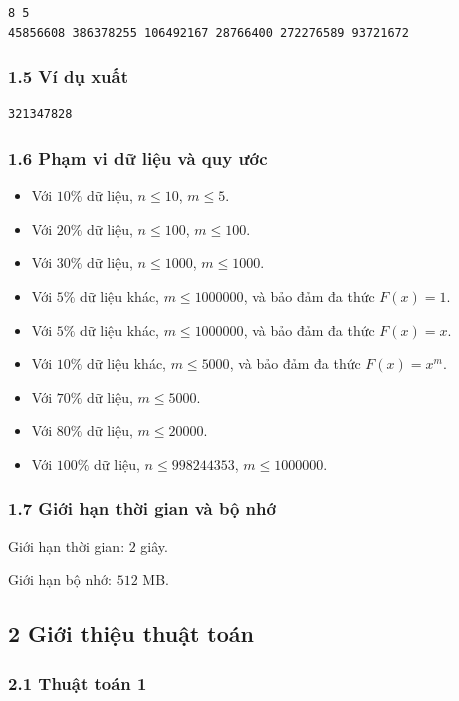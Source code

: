 \documentclass[11pt]{article}
\begin{document}
\begin{verbatim}
8 5
45856608 386378255 106492167 28766400 272276589 93721672
\end{verbatim}

\subsubsection*{1.5 Ví dụ xuất}

\begin{verbatim}
321347828
\end{verbatim}

\subsubsection*{1.6 Phạm vi dữ liệu và quy ước}

\begin{itemize}
  \item Với \(10\%\) dữ liệu, \(n\le 10\), \(m\le 5\).
  \item Với \(20\%\) dữ liệu, \(n\le 100\), \(m\le 100\).
  \item Với \(30\%\) dữ liệu, \(n\le 1000\), \(m\le 1000\).
  \item Với \(5\%\) dữ liệu khác, \(m\le 1000000\), và bảo đảm đa thức
  \(F(x)=1\).
  \item Với \(5\%\) dữ liệu khác, \(m\le 1000000\), và bảo đảm đa thức
  \(F(x)=x\).
  \item Với \(10\%\) dữ liệu khác, \(m\le 5000\), và bảo đảm đa thức
  \(F(x)=x^m\).
  \item Với \(70\%\) dữ liệu, \(m\le 5000\).
  \item Với \(80\%\) dữ liệu, \(m\le 20000\).
  \item Với \(100\%\) dữ liệu, \(n\le 998244353\), \(m\le 1000000\).
\end{itemize}

\subsubsection*{1.7 Giới hạn thời gian và bộ nhớ}

Giới hạn thời gian: \(2\) giây.

Giới hạn bộ nhớ: \(512\) MB.

\subsection*{2 Giới thiệu thuật toán}

\subsubsection*{2.1 Thuật toán 1}
\end{document}
